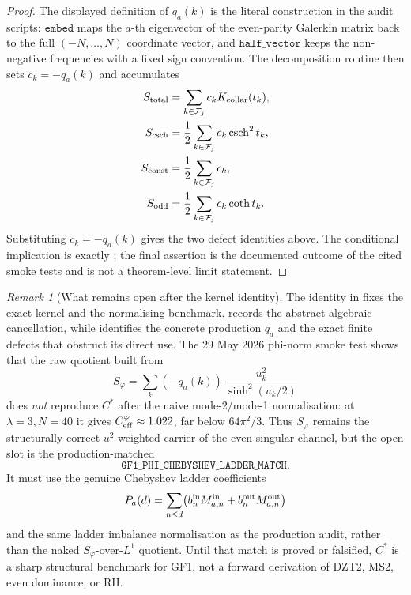 \documentclass[11pt,a4paper]{article}
\theoremstyle{remark}
\newtheorem{remark}[remark]{Remark}
\theoremstyle{plain}
\begin{document}
\begin{proof}
The displayed definition of \(q_a(k)\) is the literal construction in the
audit scripts: \(\texttt{embed}\) maps the \(a\)-th eigenvector of the
even-parity Galerkin matrix back to the full \((-N,\ldots,N)\) coordinate
vector, and \(\texttt{half\_vector}\) keeps the non-negative frequencies
with a fixed sign convention.  The decomposition routine then sets
\(c_k=-q_a(k)\) and accumulates
\[
\begin{aligned}
  S_{\rm total}
    &= \sum_{k\in\mathcal{F}_j} c_k K_{\rm collar}(t_k),\\
  S_{\rm csch}
    &= \frac12\sum_{k\in\mathcal{F}_j} c_k \operatorname{csch}^2 t_k,\\
  S_{\rm const}
    &= \frac12\sum_{k\in\mathcal{F}_j} c_k,\\
  S_{\rm odd}
    &= \frac12\sum_{k\in\mathcal{F}_j} c_k \coth t_k.
\end{aligned}
\]
Substituting \(c_k=-q_a(k)\) gives the two defect identities above.
The conditional implication is exactly
; the final assertion is the
documented outcome of the cited smoke tests and is not a theorem-level
limit statement.
\end{proof}

\begin{remark}[What remains open after the kernel identity]
\label{rem:gf1-phi-cheb-ladder-open}
The identity in  fixes the exact
kernel and the normalising benchmark.  
records the abstract algebraic cancellation, while
 identifies the concrete
production \(q_a\) and the exact finite defects that obstruct its direct
use.  The 29 May 2026 phi-norm smoke test shows
that the raw quotient built from
\[
  S_\varphi=\sum_k(-q_a(k))\,
      \frac{u_k^2}{\sinh^2(u_k/2)}
\]
does \emph{not} reproduce \(C^*\) after the naive
mode-2/mode-1 normalisation: at \(\lambda=3,N=40\) it gives
\(C_{\rm eff}^{\varphi}\approx1.022\), far below
\(64\pi^2/3\).  Thus \(S_\varphi\) remains the structurally correct
\(u^2\)-weighted carrier of the even singular channel, but the open
slot is the production-matched
\[
  \texttt{GF1\_PHI\_CHEBYSHEV\_LADDER\_MATCH}.
\]
It must use the genuine Chebyshev ladder coefficients
\[
  P_a(d)=\sum_{n\le d}\bigl(b_n^{\rm in}M_{a,n}^{\rm in}
        +b_n^{\rm out}M_{a,n}^{\rm out}\bigr)
\]
and the same ladder imbalance normalisation as the production audit,
rather than the naked \(S_\varphi\)-over-\(L^1\) quotient.  Until that
match is proved or falsified, \(C^*\) is a sharp structural benchmark
for GF1, not a forward derivation of DZT2, MS2, even dominance, or RH.
\end{remark}
\end{document}
